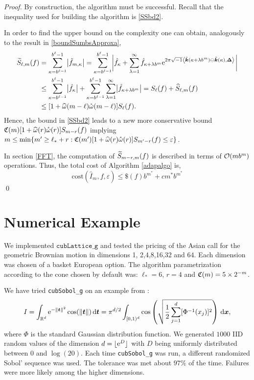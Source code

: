 \documentclass[graybox]{svmult}
\newcommand{\R}{\mathbb{R}} %
\newcommand{\bst}{\boldsymbol{t}}    %
\newcommand{\bsx}{\boldsymbol{x}}    %
\newcommand{\bsDelta}{\boldsymbol{\Delta}}    %
\begin{document}
\begin{proof}
By construction, the algorithm must be successful. Recall that the inequality used for building the algorithm is \eqref{SSbd2}.

In order to find the upper bound on the complexity one can obtain, analogously to the result in \eqref{boundSumbsApproxa},
\begin{align}
\nonumber
\tS_{\ell,m}(f) &= \sum_{\kappa=b^{\ell-1}}^{b^{\ell}-1} \bigabs{ \tf_{m,\kappa}} = \sum_{\kappa=b^{\ell-1}}^{b^{\ell}-1} \biggabs{\hf_{\kappa} + \sum_{\lambda=1}^{\infty} \hf_{\kappa+\lambda b^{m}} \E^{2 \pi \sqrt{-1} \ip{\tvk(\kappa+\lambda b^{m}) \ominus \tvk(\kappa)}{\bsDelta}}}\\
\nonumber
&\le \sum_{\kappa=b^{\ell-1}}^{b^{\ell}-1} \bigabs{\hf_{\kappa}} + \sum_{\kappa=b^{\ell-1}}^{b^{\ell}-1} \sum_{\lambda=1}^{\infty} \bigabs{\hf_{\kappa+\lambda b^{m}}} 
= S_{\ell}(f) + \hS_{\ell,m}(f) \\
\nonumber
&\le [1  + \homega(m-\ell) \wcomega(m-\ell)] S_\ell(f). \label{SSbd3}
\end{align}
Hence, the bound in \eqref{SSbd2} leads to a new more conservative bound $\mathfrak{C}(m) [1  + \widehat{\omega}(r) \mathring{\omega}(r)] S_{m-r}(f)$ implying $
m \le {\min \{m' \ge \ell_*+r : \mathfrak{C}(m') [1+ \widehat{\omega}(r) \mathring{\omega}(r)] S_{m'-r}(f) \le \varepsilon \}}$.

In section \ref{FFT}, the computation of $\widetilde{S}_{m-r,m}(f)$ is described in terms of $\mathcal{O}(mb^m)$ operations. Thus, the total cost of Algorithm \ref{adapalgo} is,
\[
\mathrm{cost}\left(\widehat{I}_m,f,\varepsilon\right)\leq \$(f)b^{m^*}+cm^*b^{m^*}
\]
\hfill \qed
\end{proof}

\section{Numerical Example} \label{secnumexpsec}

We implemented $\texttt{cubLattice\_g}$ and tested the pricing of the Asian call for the geometric Brownian motion in dimensions 1, 2,4,8,16,32 and 64. Each dimension was chosen 
 of a basket European option. The algorithm parametrization according to the cone chosen by default was: $\ell_*=6$, $r=4$ and $\mathfrak{C}(m)=5 \times 2^{-m}$.

We have tried \texttt{cubSobol\_g} on an example from \cite{Kei96}:
\begin{equation} \label{KeisterEx}
I=\int_{\R^d} \E^{-\norm{\bst}^2} \cos(\norm{\bst}) \, \D \bst 
= \pi^{d/2}\int_{\cube} \cos\left(\sqrt{\frac 12 \sum_{j=1}^d [\Phi^{-1}(x_j)]^2} \right) \, \D \bsx,
\end{equation}
where $\Phi$ is the standard Gaussian distribution function.  We generated $1000$ IID random values of the dimension $d=\lfloor \mathrm{e}^D \rfloor$ with $D$ being uniformly distributed between $0$ and $\log(20)$.  Each time \texttt{cubSobol\_g} was run, a different randomized Sobol' sequence was used.  The tolerance was met about $97\%$ of the time.  Failures were more likely among the higher dimensions.
\end{document}
